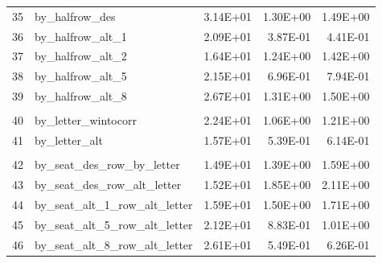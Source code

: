 \documentclass[11pt]{article}
\begin{document}
\begin{table}[htbp]
\begin{tabular}{rlrrr}
    \end{tabular}%

  \label{tab:fig1}%
\end{table}%
\begin{table}[t]
	\centering
	\begin{tabular}{rlrrr}
		 35    & by\_halfrow\_des & 3.14E+01 & 1.30E+00 & 1.49E+00 \\
		36    & by\_halfrow\_alt\_1 & 2.09E+01 & 3.87E-01 & 4.41E-01 \\
		37    & by\_halfrow\_alt\_2 & 1.64E+01 & 1.24E+00 & 1.42E+00 \\
		38    & by\_halfrow\_alt\_5 & 2.15E+01 & 6.96E-01 & 7.94E-01 \\
		39    & by\_halfrow\_alt\_8 & 2.67E+01 & 1.31E+00 & 1.50E+00 \\
		&       &       &       &  \\
		40    & by\_letter\_wintocorr & 2.24E+01 & 1.06E+00 & 1.21E+00 \\
		41    & by\_letter\_alt & 1.57E+01 & 5.39E-01 & 6.14E-01 \\
		&       &       &       &  \\
		42    & by\_seat\_des\_row\_by\_letter & 1.49E+01 & 1.39E+00 & 1.59E+00 \\
		43    & by\_seat\_des\_row\_alt\_letter & 1.52E+01 & 1.85E+00 & 2.11E+00 \\
		44    & by\_seat\_alt\_1\_row\_alt\_letter & 1.59E+01 & 1.50E+00 & 1.71E+00 \\
		45    & by\_seat\_alt\_5\_row\_alt\_letter & 2.12E+01 & 8.83E-01 & 1.01E+00 \\
		46    & by\_seat\_alt\_8\_row\_alt\_letter & 2.61E+01 & 5.49E-01 & 6.26E-01 \\
	\end{tabular}
\end{table}
\end{document}
